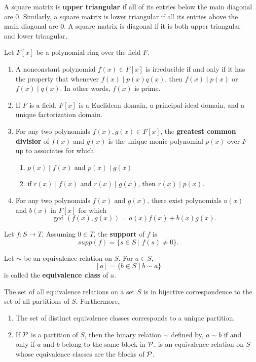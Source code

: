 \begin{definition}
A square matrix is \textbf{upper triangular} if all of its entries below the main diagonal are 0. Similarly, a square matrix is lower triangular if all its entries above the main diagonal are 0. A square matrix is diagonal if it is both upper triangular and lower triangular.
\end{definition}

\begin{theorem} Let $F[x]$ be a polynomial ring over the field $F$.
\begin{enumerate}
\item A nonconstant polynomial $f(x)\in F[x]$ is irreducible if and only if it has the property that whenever $f(x)\mid p(x)q(x)$, then $f(x)\mid p(x)$ or $f(x)\mid q(x)$. In other words, $f(x)$ is prime.
\item If $F$ is a field, $F[x]$ is a Euclidean domain, a principal ideal domain, and a unique factorization domain.
\item For any two polynomials $f(x),g(x)\in F[x]$, the \textbf{greatest common divisior} of $f(x)$ and $g(x)$ is the unique monic polynomial $p(x)$ over $F$ up to associates for which
\begin{enumerate}
\item $p(x)\mid f(x)$ and $p(x)\mid g(x)$
\item if $r(x)\mid f(x)$ and $r(x)\mid g(x)$, then $r(x)\mid p(x)$.
\end{enumerate}
\item For any two polynomials $f(x)$ and $g(x)$, there exist polynomials $a(x)$ and $b(x)$ in $F[x]$ for which
\[\gcd(f(x),g(x))=a(x)f(x)+b(x)g(x).\]
\end{enumerate}
\end{theorem}

\begin{definition}
Let $f\colon S\rightarrow T$. Assuming $0\in T$, the \textbf{support} of $f$ is 
\[supp(f)=\{s\in S\mid f(s)\neq 0\}.\]
\end{definition}

\begin{definition}
Let $\sim$ be an equivalence relation on $S$. For $a\in S$,
\[[a]=\{b\in S\mid b\sim a\}\]
is called the \textbf{equivalence class} of $a$.
\end{definition}

\begin{theorem} 
The set of all equivalence relations on a set $S$ is in bijective correspondence to the set of all partitions of $S$. Furthermore,
\begin{enumerate}
\item The set of distinct equivalence classes corresponds to a unique partition.
\item If ${\mathcal{P}}$ is a partition of $S$, then the binary relation $\sim$ defined by, $a\sim b$ if and only if $a$ and $b$ belong to the same block in ${\mathcal{P}}$, is an equivalence relation on $S$ whose equivalence classes are the blocks of ${\mathcal{P}}$.
\end{enumerate}
\end{theorem}

